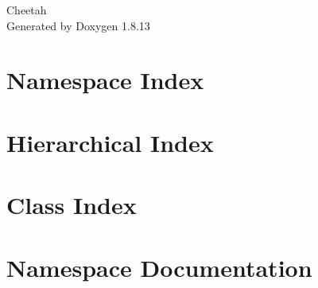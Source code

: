 \documentclass[twoside]{book}
\newcommand{\+}{\discretionary{\mbox{\scriptsize$\hookleftarrow$}}{}{}}
\newcommand{\clearemptydoublepage}{%
  \newpage{\pagestyle{empty}\cleardoublepage}%
}
\begin{document}
\hypersetup{pageanchor=false,
             bookmarksnumbered=true,
             pdfencoding=unicode
            }
\begin{titlepage}
\vspace*{7cm}
\begin{center}%
{\Large Cheetah }\\
\vspace*{1cm}
{\large Generated by Doxygen 1.8.13}\\
\end{center}
\end{titlepage}
\clearemptydoublepage
{}
\tableofcontents
\clearemptydoublepage
{}
\hypersetup{pageanchor=true}

\chapter{Namespace Index}

\chapter{Hierarchical Index}

\chapter{Class Index}

\chapter{Namespace Documentation}















\end{document}
